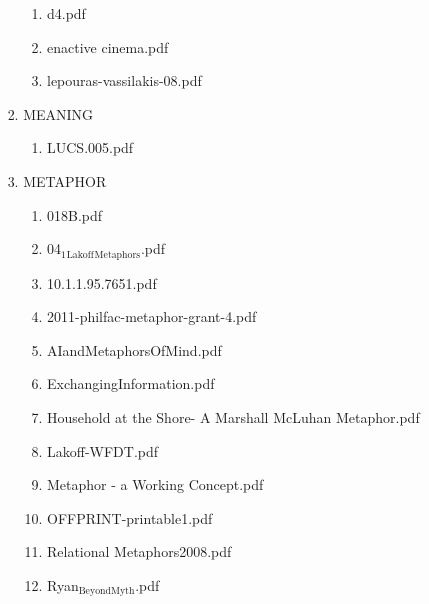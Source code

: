 \documentclass[11pt]{article}
\begin{document}
\begin{enumerate}
\begin{enumerate}
\begin{enumerate}
\begin{enumerate}
\begin{enumerate}
\item d4.pdf
\label{sec-1-1-1-1-7-3-33-14}

\item enactive cinema.pdf
\label{sec-1-1-1-1-7-3-33-15}

\item lepouras-vassilakis-08.pdf
\label{sec-1-1-1-1-7-3-33-16}
\end{enumerate}

\item MEANING
\label{sec-1-1-1-1-7-3-34}
\begin{enumerate}
\item LUCS.005.pdf
\label{sec-1-1-1-1-7-3-34-1}
\end{enumerate}

\item METAPHOR
\label{sec-1-1-1-1-7-3-35}
\begin{enumerate}
\item 018B.pdf
\label{sec-1-1-1-1-7-3-35-1}

\item 04$_{\text{1}}$$_{\text{Lakoff}}$$_{\text{Metaphors}}$.pdf
\label{sec-1-1-1-1-7-3-35-2}

\item 10.1.1.95.7651.pdf
\label{sec-1-1-1-1-7-3-35-3}

\item 2011-philfac-metaphor-grant-4.pdf
\label{sec-1-1-1-1-7-3-35-4}

\item AIandMetaphorsOfMind.pdf
\label{sec-1-1-1-1-7-3-35-5}

\item ExchangingInformation.pdf
\label{sec-1-1-1-1-7-3-35-6}

\item Household at the Shore- A Marshall McLuhan Metaphor.pdf
\label{sec-1-1-1-1-7-3-35-7}

\item Lakoff-WFDT.pdf
\label{sec-1-1-1-1-7-3-35-8}

\item Metaphor - a Working Concept.pdf
\label{sec-1-1-1-1-7-3-35-9}

\item OFFPRINT-printable1.pdf
\label{sec-1-1-1-1-7-3-35-10}

\item Relational Metaphors2008.pdf
\label{sec-1-1-1-1-7-3-35-11}

\item Ryan$_{\text{BeyondMyth}}$.pdf
\label{sec-1-1-1-1-7-3-35-12}


\end{enumerate}
\end{enumerate}
\end{enumerate}
\end{enumerate}
\end{enumerate}
\end{document}

